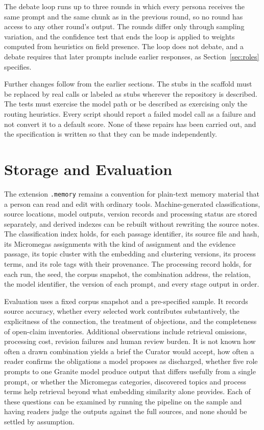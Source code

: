 \documentclass[11pt]{article}
\begin{document}
The debate loop runs up to three rounds in which every persona receives the same prompt and the same chunk as in the previous round, so no round has access to any other round's output. The rounds differ only through sampling variation, and the confidence test that ends the loop is applied to weights computed from heuristics on field presence. The loop does not debate, and a debate requires that later prompts include earlier responses, as Section~\ref{sec:roles} specifies.

Further changes follow from the earlier sections. The stubs in the scaffold must be replaced by real calls or labeled as stubs wherever the repository is described. The tests must exercise the model path or be described as exercising only the routing heuristics. Every script should report a failed model call as a failure and not convert it to a default score. None of these repairs has been carried out, and the specification is written so that they can be made independently.

\section{Storage and Evaluation}

The extension \texttt{.memory} remains a convention for plain-text memory material that a person can read and edit with ordinary tools. Machine-generated classifications, source locations, model outputs, version records and processing status are stored separately, and derived indexes can be rebuilt without rewriting the source notes. The classification index holds, for each passage identifier, its source file and hash, its Micromegas assignments with the kind of assignment and the evidence passage, its topic cluster with the embedding and clustering versions, its process terms, and its role tags with their provenance. The processing record holds, for each run, the seed, the corpus snapshot, the combination address, the relation, the model identifier, the version of each prompt, and every stage output in order.

Evaluation uses a fixed corpus snapshot and a pre-specified sample. It records source accuracy, whether every selected work contributes substantively, the explicitness of the connection, the treatment of objections, and the completeness of open-claim inventories. Additional observations include retrieval omissions, processing cost, revision failures and human review burden. It is not known how often a drawn combination yields a brief the Curator would accept, how often a reader confirms the obligations a model proposes as discharged, whether five role prompts to one Granite model produce output that differs usefully from a single prompt, or whether the Micromegas categories, discovered topics and process terms help retrieval beyond what embedding similarity alone provides. Each of these questions can be examined by running the pipeline on the sample and having readers judge the outputs against the full sources, and none should be settled by assumption.
\end{document}
